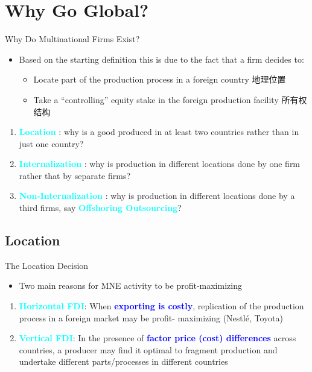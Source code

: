 \documentclass[10pt,hyperref={CJKbookmarks=true},xcolor=dvipsnames,aspectratio=169]{beamer}
\begin{document}
\section{Why Go Global?}
\begin{frame}{Why Do Multinational Firms Exist? }

\begin{itemize}
\item Based on the starting definition this is due to the fact that a firm
decides to: 

\begin{itemize}
\item Locate part of the production process in a foreign country 地理位置
\item Take a “controlling” equity stake in the foreign production facility
所有权结构
\end{itemize}
\end{itemize}
\begin{enumerate}
\item \textbf{\textcolor{cyan}{Location}} : why is a good produced in at
least two countries rather than in just one country? 
\item \textbf{\textcolor{cyan}{Internalization}} : why is production in
different locations done by one firm rather that by separate firms? 
\item \textbf{\textcolor{cyan}{Non-Internalization}} : why is production in
different locations done by a third firms, say \textbf{\textcolor{cyan}{Offshoring Outsourcing}}?
\end{enumerate}
\end{frame}



\subsection{Location}
\begin{frame}{The Location Decision}

\begin{itemize}
\item Two main reasons for MNE activity to be profit-maximizing \end{itemize}
\begin{enumerate}
\item \textbf{\textcolor{cyan}{Horizontal FDI}}: When \textbf{\textcolor{blue}{exporting
is costly}}, replication of the production process in a foreign market
may be profit- maximizing (Nestlé, Toyota) 
\item \textbf{\textcolor{cyan}{Vertical FDI}}: In the presence of \textbf{\textcolor{blue}{factor
price (cost) differences}} across countries, a producer may find it
optimal to fragment production and undertake different parts/processes
in different countries 
\end{enumerate}
\end{frame}
\end{document}
